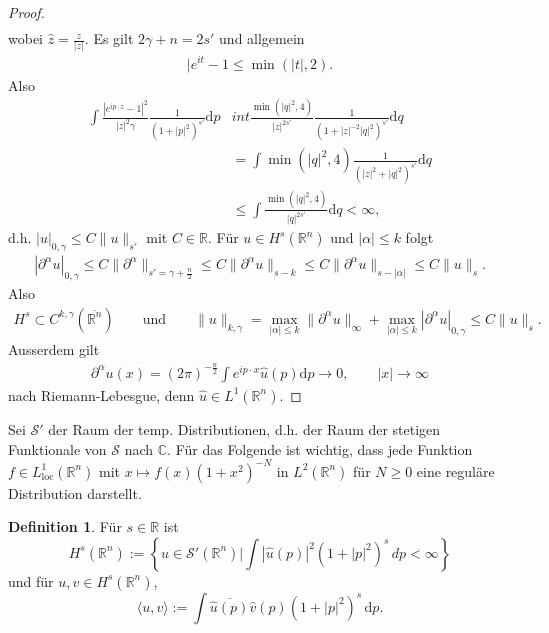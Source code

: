 \documentclass[
paper=a4,
bibtotocnumbered,
liststotocnumbered,
tablecaptionabove,
pointlessnumbers,
twoside,
openright,
10pt
]
{report}
\theoremstyle{definition}
\newtheorem*{df}{Definition}
\numberwithin{equation}{chapter}
\begin{document}
\begin{proof}
\begin{align*}
\end{align*}
wobei $\widehat{z}= \frac{z}{|z|}$. Es gilt $2\gamma +n = 2 s'$ und allgemein
\begin{align*}
|e^{it}-1 \leq \min(|t|,2).
\end{align*}
Also 
\begin{align*}
\int \frac{|e^{ip \cdot z} -1|^2}{|z|^2\gamma} \frac{1}{(1+|p|^2)^{s'}} \mathrm{d}p &int \frac{\min(|q|^2,4)}{|z|^{2s'}} \frac{1}{(1+|z|^{-2}|q|^2)^{s'}}\mathrm{d}q
\\ & = \int \min(|q|^2,4) \frac{1}{(|z|^2 + |q|^2)^{s'}}\mathrm{d}q
\\ & \leq \int \frac{\min(|q|^2,4)}{|q|^{2s'}}\mathrm{d}q < \infty,
\end{align*}
d.h. $|u|_{0,\gamma} \leq C\|u\|_{s'}$ mit $C \in \mathbb{R}$. Für $u \in H^s(\mathbb{R}^n)$ und $|\alpha| \leq k$ folgt
\begin{align*}
|\partial^\alpha u|_{0, \gamma} \leq C \|\partial^\alpha\|_{s'=\gamma + \frac{n}{2}} \leq C \|\partial^\alpha u \|_{s-k} \leq C \| \partial^\alpha u \|_{s-|\alpha|} \leq C \|u\|_s.
\end{align*}
Also
\begin{align*}
H^s \subset C^{k,\gamma}(\overline{\mathbb{R}^n}) \qquad \text{und} \qquad \|u\|_{k,\gamma} = \max_{|\alpha| \leq k} \|\partial^\alpha u\|_{\infty} + \max_{|\alpha| \leq k} |\partial^\alpha u|_{0,\gamma} \leq C \|u\|_s.
\end{align*}
Ausserdem gilt 
\begin{align*}
\partial^\alpha u(x) = (2 \pi)^{- \frac{n}{2}} \int e^{ip \cdot x} \widehat{u}(p) \mathrm{d}p \rightarrow 0, \qquad |x| \to \infty
\end{align*}
nach Riemann-Lebesgue, denn $\widehat{u} \in L^1(\mathbb{R}^n).$
\end{proof}
Sei $\mathcal{S}'$ der Raum der temp. Distributionen, d.h. der Raum der stetigen Funktionale von $\mathcal{S}$ nach $\mathbb{C}$. Für das Folgende ist wichtig, dass jede Funktion $f \in L_{\text{loc}}^1(\mathbb{R}^n)$ mit $x \mapsto f(x)(1+x^2)^{-N}$ in $L^2(\mathbb{R}^n)$ für $N \geq 0$ eine reguläre Distribution darstellt.
\begin{df}
Für $s\in \mathbb {R}$ ist
\begin{equation}
H^s(\mathbb R^n):= \left \{ u \in \mathcal S'(\mathbb R^n) \bigg | \int |\hat u(p)|^2 (1+|p|^2)^s\, dp < \infty \right \}
\end{equation}
und für $u,v \in H^s(\mathbb R^n)$,
\begin{equation}
\langle u,v\rangle := \int \overline{\hat u(p)} \hat v(p)(1+|p|^2)^s \, \mathrm dp.
\end{equation}
\end{df}
\end{document}
